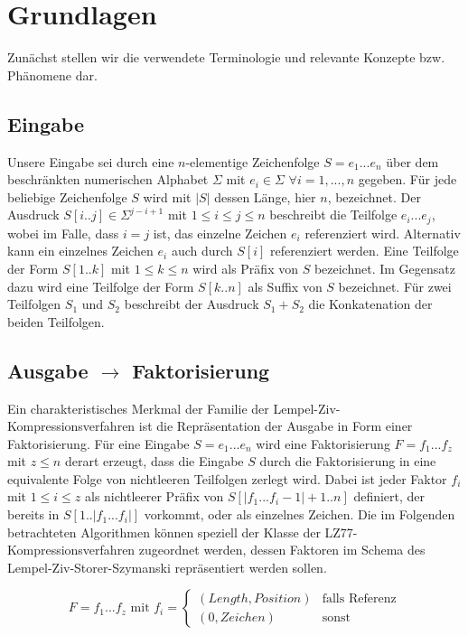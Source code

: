 \chapter{Grundlagen}

Zunächst stellen wir die verwendete Terminologie und relevante Konzepte bzw. Phänomene dar.

\section{Eingabe}
Unsere Eingabe sei durch eine $n$-elementige Zeichenfolge $S=e_1...e_n$ über dem beschränkten numerischen Alphabet $\Sigma$ mit $e_i\in \Sigma$ $\forall i=1,...,n$ gegeben. Für jede
beliebige Zeichenfolge $S$ wird mit $|S|$ dessen Länge, hier $n$, bezeichnet. Der Ausdruck $S[i..j]\in \Sigma^{j-i+1}$ mit $1\leq i\leq j\leq n$ beschreibt die Teilfolge $e_i...e_j$,
wobei im Falle, dass $i=j$ ist, das einzelne Zeichen $e_i$ referenziert wird. Alternativ kann ein einzelnes Zeichen $e_i$ auch durch $S[i]$ referenziert werden. Eine Teilfolge 
der Form $S[1..k]$ mit $1\leq k\leq n$ wird als Präfix von $S$ bezeichnet. Im Gegensatz dazu wird eine Teilfolge der Form $S[k..n]$ als Suffix von $S$ bezeichnet. Für zwei Teilfolgen
$S_1$ und $S_2$ beschreibt der Ausdruck $S_1+S_2$ die Konkatenation der beiden Teilfolgen.

\section{Ausgabe $\rightarrow$ Faktorisierung}
Ein charakteristisches Merkmal der Familie der Lempel-Ziv-Kompressionsverfahren ist die Repräsentation der Ausgabe in Form einer Faktorisierung. Für eine Eingabe $S=e_1...e_n$ 
wird eine Faktorisierung $F=f_1...f_z$ mit $z\leq n$ derart erzeugt, dass die Eingabe $S$ durch die Faktorisierung in eine equivalente Folge von nichtleeren Teilfolgen zerlegt wird. Dabei
ist jeder Faktor $f_i$ mit $1\leq i\leq z$ als nichtleerer Präfix von $S[|f_1...f_i-1|+1..n]$ definiert, der bereits in $S[1..|f_1...f_i|]$ vorkommt, oder als einzelnes Zeichen.
Die im Folgenden betrachteten Algorithmen können speziell der Klasse der LZ77-Kompressionsverfahren zugeordnet werden, dessen Faktoren im Schema des Lempel-Ziv-Storer-Szymanski
\cite{lzss} repräsentiert werden sollen. 

\begin{equation} \label{eq:faktor}
    F = f_1...f_z \text{ mit } f_i = \begin{cases} (Length, Position) & \text{falls Referenz} \\ (0, Zeichen) & \text{sonst} \end{cases}
\end{equation}

